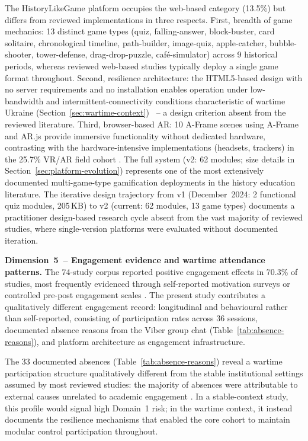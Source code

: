 The HistoryLikeGame platform occupies the web-based category (13.5\%) but differs from
reviewed implementations in three respects.
First, breadth of game mechanics: 13 distinct game types (quiz, falling-answer,
block-buster, card solitaire, chronological timeline, path-builder, image-quiz,
apple-catcher, bubble-shooter, tower-defense, drag-drop-puzzle, caf\'{e}-simulator)
across 9 historical periods, whereas reviewed web-based studies typically deploy a
single game format throughout.
Second, resilience architecture: the HTML5-based design with no server requirements
and no installation enables operation under low-bandwidth and intermittent-connectivity
conditions characteristic of wartime Ukraine (Section~\ref{sec:wartime-context})
\cite{Burde2017}~-- a design criterion absent from the reviewed literature.
Third, browser-based AR: 10 A-Frame scenes using A-Frame and AR.js provide
immersive functionality without dedicated hardware, contrasting with the hardware-intensive
implementations (headsets, trackers) in the 25.7\% VR/AR field cohort
\cite{13Humpire2022, 15Slater2022, 10Huaman2019220}.
The full system (v2: 62 modules; size details in Section~\ref{sec:platform-evolution}) represents one of the most extensively documented
multi-game-type gamification deployments in the history education literature.
The iterative design trajectory from v1 (December~2024: 2 functional quiz modules, 205\,KB)
to v2 (current: 62 modules, 13 game types) documents a practitioner design-based
research cycle \cite{Reeves2003} absent from the vast majority of reviewed studies,
where single-version platforms were evaluated without documented iteration.

\textbf{Dimension~5~-- Engagement evidence and wartime attendance patterns.}
The 74-study corpus reported positive engagement effects in 70.3\% of studies, most
frequently evidenced through self-reported motivation surveys or controlled pre-post
engagement scales \cite{KorniienkoSemerikov2024, Hamari2014, Sailer2017}.
The present study contributes a qualitatively different engagement record: longitudinal
and behavioural rather than self-reported, consisting of participation rates across
36 sessions, documented absence reasons from the Viber group chat
(Table~\ref{tab:absence-reasons}), and platform architecture as engagement infrastructure.

The 33 documented absences (Table~\ref{tab:absence-reasons}) reveal a wartime participation structure qualitatively different from the stable institutional settings assumed by most reviewed studies: the majority of absences were attributable to external causes unrelated to academic engagement \cite{Burde2017, UNESCO2023}. In a stable-context study, this profile would signal high Domain~1 risk; in the wartime context, it instead documents the resilience mechanisms that enabled the core cohort to maintain modular control participation throughout.

